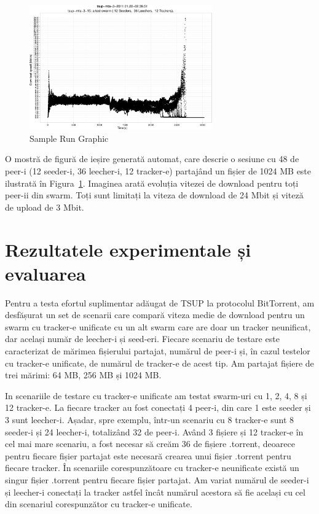 \begin{figure}[h]
  \begin{center}
    \includegraphics[width=0.7\textwidth]{src/img/unified-tracker/tsup-sample-run-48peers}
  \end{center}
  \caption{Sample Run Graphic}
  \label{fig:unified-tracker:tsup-sample-run}
\end{figure}

O mostră de figură de ieșire generată automat, care descrie o sesiune cu 48 de peer-i (12 seeder-i, 36 leecher-i, 12 tracker-e) partajând un fișier de 1024 MB este ilustrată în Figura~\ref{fig:unified-tracker:tsup-sample-run}. Imaginea arată evoluția vitezei de download pentru toți peer-ii din swarm. Toți sunt limitați la viteza de download de 24 Mbit și viteză de upload de 3 Mbit.

\section{Rezultatele experimentale și evaluarea}
\label{sec:unified-tracker:results}

Pentru a testa efortul suplimentar adăugat de TSUP la protocolul BitTorrent, am desfășurat un set de scenarii care compară viteza medie de download pentru un swarm cu tracker-e unificate cu un alt swarm care are doar un tracker neunificat, dar același număr de leecher-i și seed-eri. Fiecare scenariu de testare este caracterizat de mărimea fișierului partajat, numărul de peer-i și, în cazul testelor cu tracker-e unificate, de numărul de tracker-e de acest tip. Am partajat fișiere de trei mărimi: 64 MB, 256 MB și 1024 MB.

In scenariile de testare cu tracker-e unificate am testat swarm-uri cu 1, 2, 4, 8 și 12 tracker-e. La fiecare tracker au fost conectați 4 peer-i, din care 1 este seeder și 3 sunt leecher-i. Așadar, spre exemplu, într-un scenariu cu 8 tracker-e sunt 8 seeder-i și 24 leecher-i, totalizând 32 de peer-i. Având 3 fișiere și 12 tracker-e în cel mai mare scenariu, a fost necesar să creăm 36 de fișiere .torrent, deoarece pentru fiecare fișier partajat este necesară crearea unui fișier .torrent pentru fiecare tracker. În scenariile corespunzătoare cu tracker-e neunificate există un singur fișier .torrent pentru fiecare fișier partajat. Am variat numărul de seeder-i și leecher-i conectați la tracker astfel încât numărul acestora să fie același cu cel din scenariul corespunzător cu tracker-e unificate.


